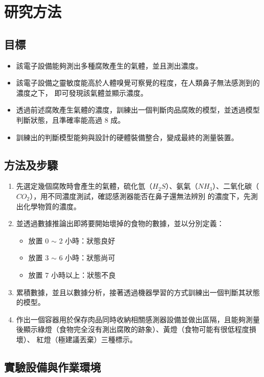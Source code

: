 \chapter{研究方法}

\section{目標}
\begin{itemize}
	\item 該電子設備能夠測出多種腐敗產生的氣體，並且測出濃度。
	\item 該電子設備之靈敏度能高於人體嗅覺可察覺的程度，在人類鼻子無法感測到的濃度之下，
		即可發現該氣體並顯示濃度。
	\item 透過前述腐敗產生氣體的濃度，訓練出一個判斷肉品腐敗的模型，並透過模型判斷狀態，且準確率能高過 8 成。 
	\item 訓練出的判斷模型能夠與設計的硬體裝備整合，變成最終的測量裝置。
\end{itemize}

\section{方法及步驟}
\begin{enumerate}
	\item 先選定幾個腐敗時會產生的氣體，硫化氫（$H_2S$）、氨氣（$NH_3$）、二氧化碳（$CO_2$），用不同濃度測試，確認感測器能否在鼻子還無法辨別
		的濃度下，先測出化學物質的濃度。
	\item 並透過數據推論出即將要開始壞掉的食物的數據，並以分別定義：\begin{itemize}
	 	\item 放置 0 $\sim$ 2 小時：狀態良好
		\item 放置 3 $\sim$ 6 小時：狀態尚可
		\item 放置 7 小時以上：狀態不良
		\end{itemize}
	\item 累積數據，並且以數據分析，接著透過機器學習的方式訓練出一個判斷其狀態的模型。
	\item 作出一個容器用於保存肉品同時收納相關感測器設備並做出區隔，且能夠測量後顯示綠燈（食物完全沒有測出腐敗的跡象）、黃燈（食物可能有很低程度損壞）、
		紅燈（極建議丟棄）三種標示。 
\end{enumerate}

\section{實驗設備與作業環境}
